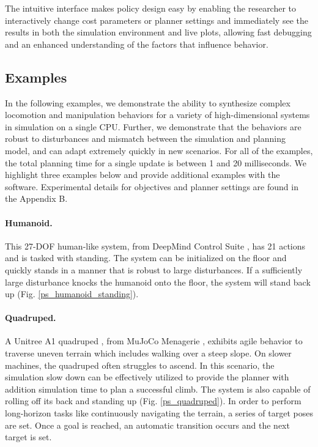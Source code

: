 The intuitive interface makes policy design easy by enabling the researcher to interactively change cost parameters or planner settings and immediately see the results in both the simulation environment and live plots, allowing fast debugging and an enhanced understanding of the factors that influence behavior.

\subsection{Examples}

In the following examples, we demonstrate the ability to synthesize complex locomotion and manipulation behaviors for a variety of high-dimensional systems in simulation on a single CPU. Further, we demonstrate that the behaviors are robust to disturbances and mismatch between the simulation and planning model, and can adapt extremely quickly in new scenarios. For all of the examples, the total planning time for a single update is between 1 and 20 milliseconds. We highlight three examples below and provide additional examples with the software. Experimental details for objectives and planner settings are found in the Appendix B.

\paragraph{Humanoid.}
This 27-DOF human-like system, from DeepMind Control Suite \cite{tunyasuvunakool2020dm_control}, has 21 actions and is tasked with standing. The system can be initialized on the floor and quickly stands in a manner that is robust to large disturbances. If a sufficiently large disturbance knocks the humanoid onto the floor, the system will stand back up (Fig. \ref{ps_humanoid_standing}).

\paragraph{Quadruped.}
A Unitree A1 quadruped \cite{unitree2022a1}, from MuJoCo Menagerie \cite{menagerie2022github}, exhibits agile behavior to traverse uneven terrain which includes walking over a steep slope. On slower machines, the quadruped often struggles to ascend. In this scenario, the simulation slow down can be effectively utilized to provide the planner with addition simulation time to plan a successful climb. The system is also capable of rolling off its back and standing up (Fig. \ref{ps_quadruped}). In order to perform long-horizon tasks like continuously navigating the terrain, a series of target poses are set. Once a goal is reached, an automatic transition occurs and the next target is set. 

